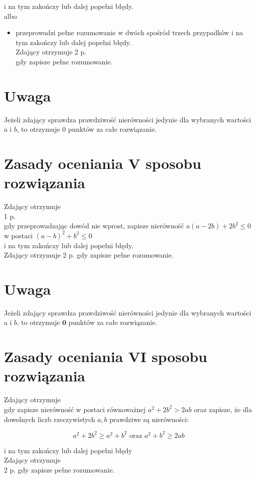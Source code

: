 \documentclass[10pt]{article}
\begin{document}
i na tym zakończy lub dalej popełni błędy.\\
albo

\begin{itemize}
  \item przeprowadzi pełne rozumowanie w dwóch spośród trzech przypadków i na tym zakończy lub dalej popełni błędy.\\
Zdający otrzymuje 2 p.\\
gdy zapisze pełne rozumowanie.
\end{itemize}

\section*{Uwaga}
Jeżeli zdający sprawdza prawdziwość nierówności jedynie dla wybranych wartości a i $b$, to otrzymuje 0 punktów za całe rozwiązanie.

\section*{Zasady oceniania V sposobu rozwiązania}
Zdający otrzymuje\\
1 p.\\
gdy przeprowadzając dowód nie wprost, zapisze nierówność $a(a-2 b)+2 b^{2} \leq 0$ w postaci $(a-b)^{2}+b^{2} \leq 0$\\
i na tym zakończy lub dalej popełni błędy.\\
Zdający otrzymuje 2 p. gdy zapisze pełne rozumowanie.

\section*{Uwaga}
Jeżeli zdający sprawdza prawdziwość nierówności jedynie dla wybranych wartości a i $b$, to otrzymuje $\mathbf{0}$ punktów za całe rozwiązanie.

\section*{Zasady oceniania VI sposobu rozwiązania}
Zdający otrzymuje\\
gdy zapisze nierówność w postaci równoważnej $a^{2}+2 b^{2}>2 a b$ oraz zapisze, że dla dowolnych liczb rzeczywistych $a, b$ prawdziwe są nierówności:

$$
a^{2}+2 b^{2} \geq a^{2}+b^{2} \text { oraz } a^{2}+b^{2} \geq 2 a b
$$

i na tym zakończy lub dalej popełni błędy\\
Zdający otrzymuje\\
2 p. gdy zapisze pełne rozumowanie.
\end{document}

